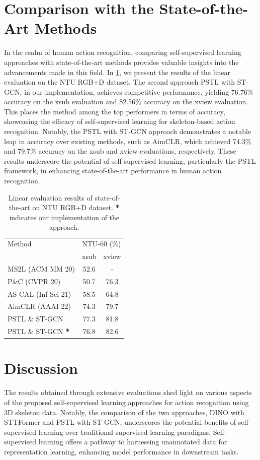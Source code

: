 \section{Comparison with the State-of-the-Art Methods}
In the realm of human action recognition, comparing self-supervised learning approaches with state-of-the-art methods provides valuable insights into the advancements made in this field. In \ref{tab:state_of_the_art}, we present the results of the linear evaluation on the NTU RGB+D dataset. The second approach PSTL \cite{zhou2023self} with ST-GCN, in our implementation, achieves competitive performance, yielding 76.76\% accuracy on the xsub evaluation and 82.56\% accuracy on the xview evaluation. This places the method among the top performers in terms of accuracy, showcasing the efficacy of self-supervised learning for skeleton-based action recognition. Notably, the PSTL with ST-GCN approach demonstrates a notable leap in accuracy over existing methods, such as AimCLR, which achieved 74.3\% and 79.7\% accuracy on the xsub and xview evaluations, respectively. These results underscore the potential of self-supervised learning, particularly the PSTL framework, in enhancing state-of-the-art performance in human action recognition. 

\begin{table}[h]
\centering
\caption{Linear evaluation results of state-of-the-art on NTU RGB+D dataset. \textbf{*} indicates our implementation of the approach.}
\label{tab:state_of_the_art}
\begin{tabular}{|l|cc|}
\hline Method & \multicolumn{2}{|c|}{NTU-60 (\%)} \\
& xsub & xview \\
\hline
MS2L (ACM MM 20) \cite{lin2020ms2l} & 52.6 & - \\
P\&C (CVPR 20) \cite{su2020predict} & 50.7 & 76.3 \\
AS-CAL (Inf Sci 21) \cite{rao2021augmented} & 58.5 & 64.8 \\
AimCLR (AAAI 22) \cite{guo2022contrastive} & 74.3 & 79.7 \\
PSTL \& ST-GCN & 77.3 & 81.8 \\
PSTL \& ST-GCN \textbf{*} & 76.8 & 82.6 \\
\hline
\end{tabular}
\end{table}

\section{Discussion}
The results obtained through extensive evaluations shed light on various aspects of the proposed self-supervised learning approaches for action recognition using 3D skeleton data. Notably, the comparison of the two approaches, DINO with STTFormer and PSTL with ST-GCN, underscores the potential benefits of self-supervised learning over traditional supervised learning paradigms. Self-supervised learning offers a pathway to harnessing unannotated data for representation learning, enhancing model performance in downstream tasks.


